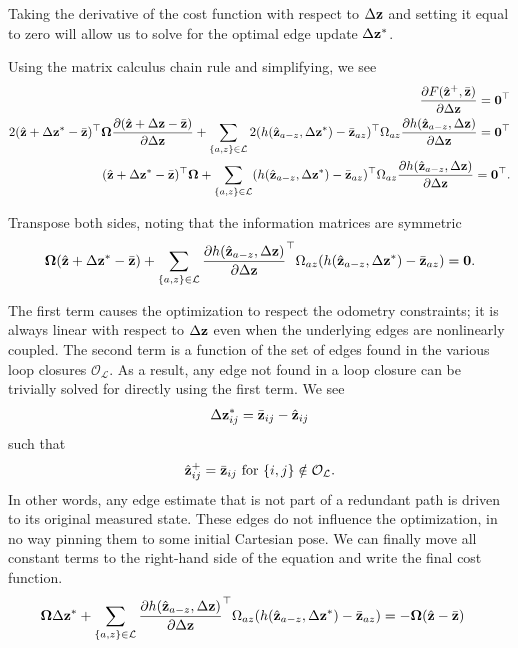 Taking the derivative of the cost function with respect to $\Delta\mathbf{z}$ and setting it equal to zero will allow us to solve for the optimal edge update $\Delta\mathbf{z}^*$.

Using the matrix calculus chain rule and simplifying, we see
\begin{align*}
  \dfrac{\partial F(\hat{\mathbf{z}}^+,\bar{\mathbf{z}})}{\partial \Delta\mathbf{z}} = \mathbf{0}^\top \\
  2 (\hat{\mathbf{z}}+\Delta\mathbf{z}^*-\bar{\mathbf{z}})^\top \boldsymbol{\Omega} \frac{\partial (\hat{\mathbf{z}}+\Delta\mathbf{z}-\bar{\mathbf{z}})}{\partial \Delta\mathbf{z}}
    + \sum_{\{a,z\} \in \mathcal{L}} 2
  (h(\hat{\mathbf{z}}_{a-z},\Delta\mathbf{z}^*)-\bar{\mathbf{z}}_{az})^\top \Omega_{az}
  \frac{\partial h(\hat{\mathbf{z}}_{a-z},\Delta\mathbf{z})}{\partial \Delta\mathbf{z}}
  = \mathbf{0}^\top
  \\
  (\hat{\mathbf{z}}+\Delta\mathbf{z}^*-\bar{\mathbf{z}})^\top \boldsymbol{\Omega}
  + \sum_{\{a,z\} \in \mathcal{L}}
  (h(\hat{\mathbf{z}}_{a-z},\Delta\mathbf{z}^*)-\bar{\mathbf{z}}_{az})^\top \Omega_{az}
  \frac{\partial h(\hat{\mathbf{z}}_{a-z},\Delta\mathbf{z})}{\partial \Delta\mathbf{z}}
  = \mathbf{0}^\top.
\end{align*}

Transpose both sides, noting that the information matrices are symmetric
\begin{align*}
  \boldsymbol{\Omega} (\hat{\mathbf{z}}+\Delta\mathbf{z}^*-\bar{\mathbf{z}})
  + \sum_{\{a,z\} \in \mathcal{L}}
  \frac{\partial h(\hat{\mathbf{z}}_{a-z},\Delta\mathbf{z})}{\partial \Delta\mathbf{z}}^\top \Omega_{az} (h(\hat{\mathbf{z}}_{a-z},\Delta\mathbf{z}^*)-\bar{\mathbf{z}}_{az})
  = \mathbf{0}.
\end{align*}

The first term causes the optimization to respect the odometry constraints; it is always linear with respect to $\Delta\mathbf{z}$ even when the underlying edges are nonlinearly coupled. The second term is a function of the set of edges found in the various loop closures $\mathcal{O_L}$. As a result, any edge not found in a loop closure can be trivially solved for directly using the first term. We see
\begin{align*}
  \Delta\mathbf{z}_{ij}^* = \bar{\mathbf{z}}_{ij} -\hat{\mathbf{z}}_{ij}
  \end{align*}
  such that
  \begin{align*}
  \hat{\mathbf{z}}_{ij}^+ = \bar{\mathbf{z}}_{ij}  \text{ for } \{i,j\} \notin \mathcal{O_L}.
\end{align*}
In other words, any edge estimate that is not part of a redundant path is driven to its original measured state. These edges do not influence the optimization, in no way pinning them to some initial Cartesian pose.   We can finally move all constant terms to the right-hand side of the equation and write the final cost function.
\begin{align}
  \boldsymbol{\Omega} \Delta\mathbf{z}^*  + \sum_{\{a,z\} \in \mathcal{L}}
  \frac{\partial h(\hat{\mathbf{z}}_{a-z},\Delta\mathbf{z})}{\partial \Delta\mathbf{z}}^\top
  \Omega_{az}(h(\hat{\mathbf{z}}_{a-z},\Delta\mathbf{z}^*)-\bar{\mathbf{z}}_{az})
  &= -\boldsymbol{\Omega}(\hat{\mathbf{z}} -\bar{\mathbf{z}})
  \label{eqn:opt}
\end{align}

